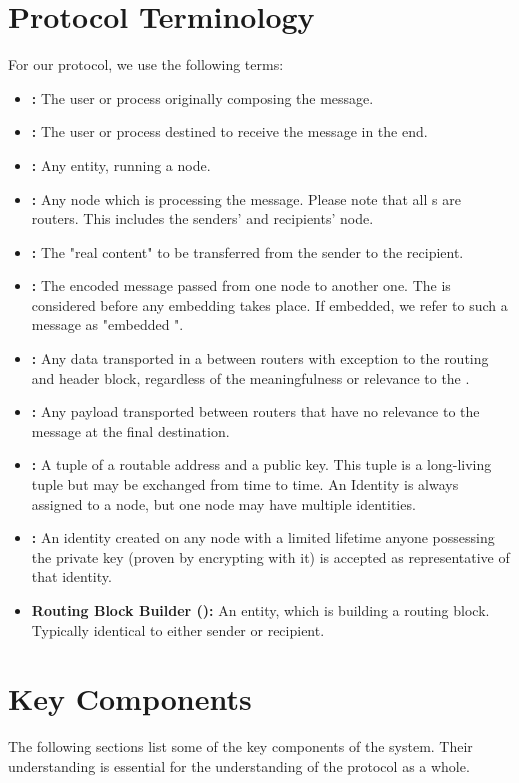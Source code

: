 \section{Protocol Terminology}
For our protocol, we use the following terms:
\begin{itemize}
	\item \textbf{:} The user or process originally composing the message.
	\item \textbf{:} The user or process destined to receive the message in the end.
	\item \textbf{:} Any entity, running a \MessageVortex{} node.
	\item \textbf{:} Any node which is processing the message. Please note that all \VortexNode{}s are routers. This includes the senders' and recipients' node.
	\item \textbf{:} The "real content" to be transferred from the sender to the recipient.    
	\item \textbf{:} The encoded message passed from one node to another one. The \VortexMessage{} is considered before any embedding takes place. If embedded, we refer to such a message as "embedded \VortexMessage".
	\item \textbf{:} Any data transported in a \VortexMessage{} between routers with exception to the routing and header block, regardless of the meaningfulness or relevance to the \VortexMessage.
	\item \textbf{:} Any payload transported between routers that have no relevance to the message at the final destination.
	\item \textbf{:} A tuple of a routable address and a public key. This tuple is a long-living tuple but may be exchanged from time to time. An Identity is always assigned to a node, but one node may have multiple identities. 
	\item \textbf{:} An identity created on any node with a limited lifetime anyone possessing the private key (proven by encrypting with it) is accepted as representative of that identity.
	\item \textbf{Routing Block Builder ():} An entity, which is building a routing block. Typically identical to either sender or recipient.
\end{itemize}

\section{Key Components}
The following sections list some of the key components of the system. Their understanding is essential for the understanding of the protocol as a whole. 

